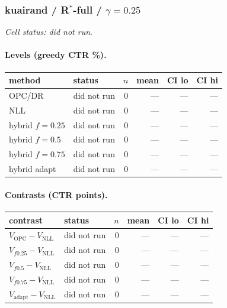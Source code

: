 \documentclass[10pt,a4paper]{article}
\begin{document}
\subsubsection{kuairand / R$^*$-full / $\gamma=0.25$}
\emph{Cell status: did not run}.
\paragraph{Levels (greedy CTR \%).}
{\centering\small\begin{tabular}{llrrrr}
\toprule method & status & $n$ & mean & CI lo & CI hi \\
\midrule
OPC/DR & did not run & 0 & --- & --- & --- \\
NLL & did not run & 0 & --- & --- & --- \\
hybrid $f{=}0.25$ & did not run & 0 & --- & --- & --- \\
hybrid $f{=}0.5$ & did not run & 0 & --- & --- & --- \\
hybrid $f{=}0.75$ & did not run & 0 & --- & --- & --- \\
hybrid adapt & did not run & 0 & --- & --- & --- \\
\bottomrule\end{tabular}\par}
\paragraph{Contrasts (CTR points).}
{\centering\small\begin{tabular}{llrrrr}
\toprule contrast & status & $n$ & mean & CI lo & CI hi \\
\midrule
$V_{\mathrm{OPC}}-V_{\mathrm{NLL}}$ & did not run & 0 & --- & --- & --- \\
$V_{f0.25}-V_{\mathrm{NLL}}$ & did not run & 0 & --- & --- & --- \\
$V_{f0.5}-V_{\mathrm{NLL}}$ & did not run & 0 & --- & --- & --- \\
$V_{f0.75}-V_{\mathrm{NLL}}$ & did not run & 0 & --- & --- & --- \\
$V_{\mathrm{adapt}}-V_{\mathrm{NLL}}$ & did not run & 0 & --- & --- & --- \\
\bottomrule\end{tabular}\par}
\end{document}
